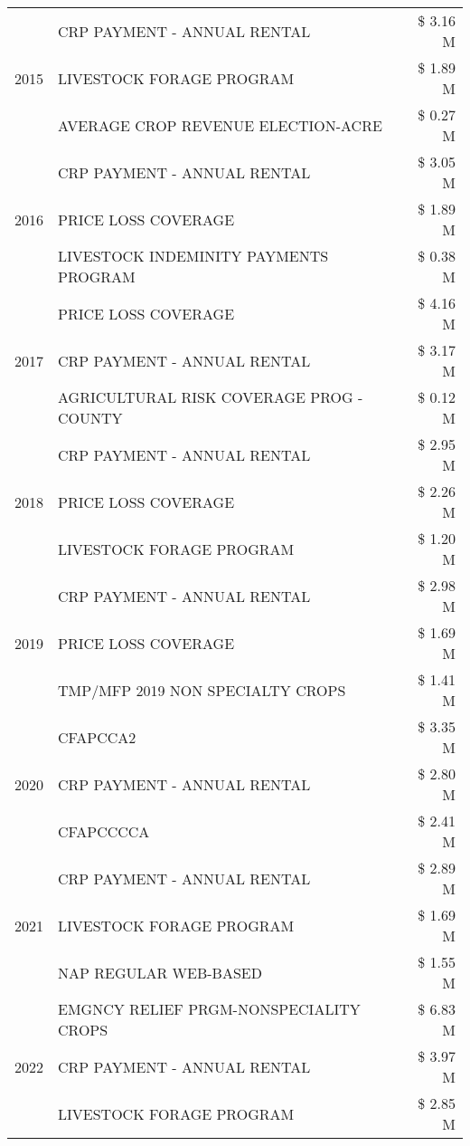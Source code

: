 \begin{tabular}{llr}
\multirow[t]{3}{*}{2015} & CRP PAYMENT - ANNUAL RENTAL & \$ 3.16 M \\
 & LIVESTOCK FORAGE PROGRAM & \$ 1.89 M \\
 & AVERAGE CROP REVENUE ELECTION-ACRE & \$ 0.27 M \\
\cline{1-3}
\multirow[t]{3}{*}{2016} & CRP PAYMENT - ANNUAL RENTAL & \$ 3.05 M \\
 & PRICE LOSS COVERAGE & \$ 1.89 M \\
 & LIVESTOCK INDEMINITY PAYMENTS PROGRAM & \$ 0.38 M \\
\cline{1-3}
\multirow[t]{3}{*}{2017} & PRICE LOSS COVERAGE & \$ 4.16 M \\
 & CRP PAYMENT - ANNUAL RENTAL & \$ 3.17 M \\
 & AGRICULTURAL RISK COVERAGE PROG - COUNTY & \$ 0.12 M \\
\cline{1-3}
\multirow[t]{3}{*}{2018} & CRP PAYMENT - ANNUAL RENTAL & \$ 2.95 M \\
 & PRICE LOSS COVERAGE & \$ 2.26 M \\
 & LIVESTOCK FORAGE PROGRAM & \$ 1.20 M \\
\cline{1-3}
\multirow[t]{3}{*}{2019} & CRP PAYMENT - ANNUAL RENTAL & \$ 2.98 M \\
 & PRICE LOSS COVERAGE & \$ 1.69 M \\
 & TMP/MFP 2019 NON SPECIALTY CROPS & \$ 1.41 M \\
\cline{1-3}
\multirow[t]{3}{*}{2020} & CFAPCCA2 & \$ 3.35 M \\
 & CRP PAYMENT - ANNUAL RENTAL & \$ 2.80 M \\
 & CFAPCCCCA & \$ 2.41 M \\
\cline{1-3}
\multirow[t]{3}{*}{2021} & CRP PAYMENT - ANNUAL RENTAL & \$ 2.89 M \\
 & LIVESTOCK FORAGE PROGRAM & \$ 1.69 M \\
 & NAP REGULAR WEB-BASED & \$ 1.55 M \\
\cline{1-3}
\multirow[t]{3}{*}{2022} & EMGNCY RELIEF PRGM-NONSPECIALITY CROPS & \$ 6.83 M \\
 & CRP PAYMENT - ANNUAL RENTAL & \$ 3.97 M \\
 & LIVESTOCK FORAGE PROGRAM & \$ 2.85 M \\
\cline{1-3}
\bottomrule
\end{tabular}
